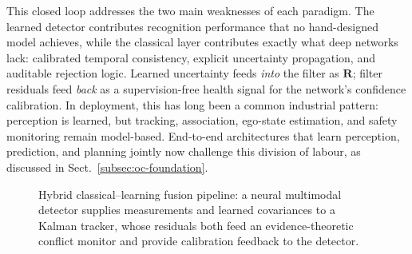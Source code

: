 \documentclass[graybox,envcountchap]{style/SNmono}
\begin{document}
This closed loop addresses the two main weaknesses of each paradigm. The learned detector contributes recognition performance that no hand-designed model achieves, while the classical layer contributes exactly what deep networks lack: calibrated temporal consistency, explicit uncertainty propagation, and auditable rejection logic. Learned uncertainty feeds \emph{into} the filter as $\mathbf{R}$; filter residuals feed \emph{back} as a supervision-free health signal for the network's confidence calibration. In deployment, this has long been a common industrial pattern: perception is learned, but tracking, association, ego-state estimation, and safety monitoring remain model-based. End-to-end architectures that learn perception, prediction, and planning jointly now challenge this division of labour, as discussed in Sect.~\ref{subsec:oc-foundation}.

\begin{figure}[!t]
    \centering
    \caption{Hybrid classical--learning fusion pipeline: a neural multimodal detector supplies measurements and learned covariances to a Kalman tracker, whose residuals both feed an evidence-theoretic conflict monitor and provide calibration feedback to the detector.}
    \label{fig:hybrid-pipeline}
\end{figure}
\end{document}
